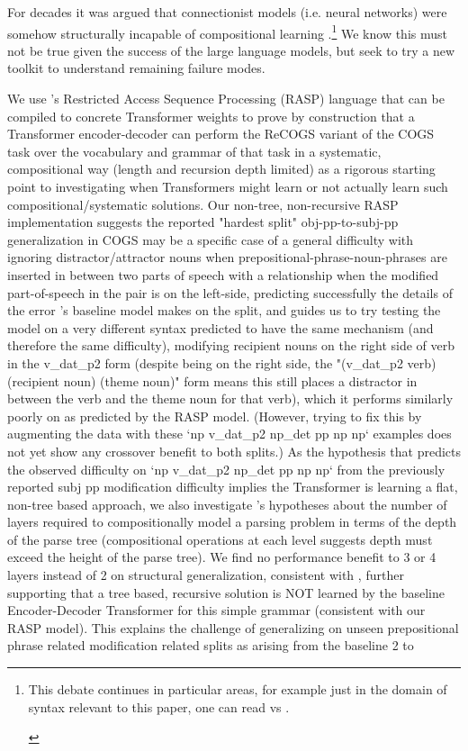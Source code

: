 \documentclass[11pt]{article}
\begin{document}
For decades it was argued that connectionist models (i.e. neural networks) were somehow structurally incapable of compositional learning \cite{FodorPylyshyn1988}.\footnote{
\begin{tiny}
This debate continues in particular areas, for example just in the domain of syntax relevant to this paper, one can read \cite{vanschijndel2019quantitydoesntbuyquality} vs \cite{goldberg2019assessingbertssyntacticabilities}.
\end{tiny}
} We know this must not be true given the success of the large language models, but seek to try a new toolkit to understand remaining failure modes.

We use \cite{Weiss2021}'s Restricted Access Sequence Processing (RASP) language that can be compiled to concrete Transformer weights to prove by construction that a Transformer encoder-decoder can perform the ReCOGS \cite{Wu2023} variant of the COGS \cite{KimLinzen2020} task over the vocabulary and grammar of that task in a systematic, compositional way (length and recursion depth limited) as a rigorous starting point to investigating when Transformers might learn or not actually learn such compositional/systematic solutions. Our non-tree, non-recursive RASP implementation suggests the reported "hardest split" obj-pp-to-subj-pp generalization in COGS may be a specific case of a general difficulty with ignoring distractor/attractor nouns when prepositional-phrase-noun-phrases are inserted in between two parts of speech with a relationship when the modified part-of-speech in the pair is on the left-side, predicting successfully the details of the error \cite{Wu2023}'s baseline model makes on the split, and guides us to try testing the model on a very different syntax predicted to have the same mechanism (and therefore the same difficulty), modifying recipient nouns on the right side of verb in the v\_dat\_p2 form (despite being on the right side, the "(v\_dat\_p2 verb) (recipient noun) (theme noun)" form means this still places a distractor in between the verb and the theme noun for that verb), which it performs similarly poorly on as predicted by the RASP model. (However, trying to fix this by augmenting the data with these `np v\_dat\_p2 np\_det pp np np` examples does not yet show any crossover benefit to both splits.) As the hypothesis that predicts the observed difficulty on `np v\_dat\_p2 np\_det pp np np` from the previously reported subj pp modification difficulty implies the Transformer is learning a flat, non-tree based approach, we also investigate \cite{Csordas2022}'s hypotheses about the number of layers required to compositionally model a parsing problem in terms of the depth of the parse tree (compositional operations at each level suggests depth must exceed the height of the parse tree). We find no performance benefit to 3 or 4 layers instead of 2 on structural generalization, consistent with \cite{petty2024impactdepthcompositionalgeneralization}, further supporting that a tree based, recursive solution is NOT learned by the \cite{Wu2023} baseline Encoder-Decoder Transformer for this simple grammar (consistent with our RASP model). This explains the challenge of generalizing on unseen prepositional phrase related modification related splits as arising from the baseline 2 to 
\end{document}
